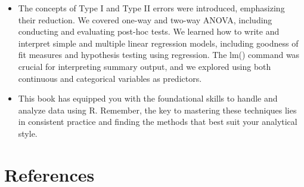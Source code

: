 \documentclass[
  letterpaper,
  DIV=11,
  numbers=noendperiod]{scrreprt}
\newlength{\cslhangindent}
\newenvironment{CSLReferences}[2] %
 {\begin{list}{}{%
  \setlength{\itemindent}{0pt}
  \setlength{\leftmargin}{0pt}
  \setlength{\parsep}{0pt}
  \ifodd #1
   \setlength{\leftmargin}{\cslhangindent}
   \setlength{\itemindent}{-1\cslhangindent}
  \fi
  \setlength{\itemsep}{#2\baselineskip}}}
 {\end{list}}
\begin{document}
\begin{itemize}
\item
  The concepts of Type I and Type II errors were introduced, emphasizing
  their reduction. We covered one-way and two-way ANOVA, including
  conducting and evaluating post-hoc tests. We learned how to write and
  interpret simple and multiple linear regression models, including
  goodness of fit measures and hypothesis testing using regression. The
  lm() command was crucial for interpreting summary output, and we
  explored using both continuous and categorical variables as
  predictors.
\item
  This book has equipped you with the foundational skills to handle and
  analyze data using R. Remember, the key to mastering these techniques
  lies in consistent practice and finding the methods that best suit
  your analytical style.
\end{itemize}


\chapter*{References}\label{references}


\label{refs}
\begin{CSLReferences}{0}{1}
\end{CSLReferences}
\end{document}
